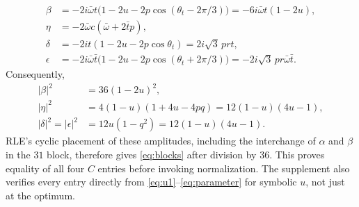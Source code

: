 \documentclass[11pt,a4paper]{article}
\theoremstyle{remark}
\begin{document}
\begin{align*}
 \beta&=-2i\bar\omega t\bigl(1-2u-2p\cos(\theta_t-2\pi/3)\bigr)
       =-6i\bar\omega t(1-2u),\\
 \eta&=-2\bar\omega c(\bar\omega+2\bar t p),\\
 \delta&=-2it(1-2u-2p\cos\theta_t)=2i\sqrt3\,pr t,\\
 \epsilon&=-2i\bar\omega\bar t\bigl(1-2u-2p\cos(\theta_t+2\pi/3)\bigr)
          =-2i\sqrt3\,pr\bar\omega\bar t.
\end{align*}
Consequently,
\begin{align*}
 |\beta|^2&=36(1-2u)^2,\\
 |\eta|^2&=4(1-u)(1+4u-4pq)=12(1-u)(4u-1),\\
 |\delta|^2=|\epsilon|^2&=12u(1-q^2)=12(1-u)(4u-1).
\end{align*}
RLE's cyclic placement of these amplitudes, including the interchange of $\alpha$ and $\beta$ in the $31$ block, therefore gives \eqref{eq:blocks} after division by $36$. This proves equality of all four $C$ entries before invoking normalization. The supplement also verifies every entry directly from \eqref{eq:u1}--\eqref{eq:parameter} for symbolic $u$, not just at the optimum.
\end{document}
